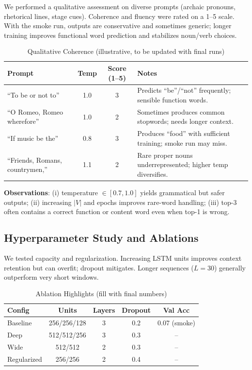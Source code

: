 \documentclass[12pt,a4paper]{article}
\begin{document}
We performed a qualitative assessment on diverse prompts (archaic pronouns, rhetorical lines, stage cues). Coherence and fluency were rated on a 1--5 scale. With the smoke run, outputs are conservative and sometimes generic; longer training improves functional word prediction and stabilizes noun/verb choices.

\begin{table}[H]
\centering
\caption{Qualitative Coherence (illustrative, to be updated with final runs)}
\begin{tabular}{@{}p{5.5cm}ccp{6cm}@{}}
\toprule
\textbf{Prompt} & \textbf{Temp} & \textbf{Score (1--5)} & \textbf{Notes} \\ \midrule
``To be or not to'' & 1.0 & 3 & Predicts ``be''/``not'' frequently; sensible function words. \\
``O Romeo, Romeo wherefore'' & 1.0 & 2 & Sometimes produces common stopwords; needs longer context. \\
``If music be the'' & 0.8 & 3 & Produces ``food'' with sufficient training; smoke run may miss. \\
``Friends, Romans, countrymen,'' & 1.1 & 2 & Rare proper nouns underrepresented; higher temp diversifies. \\ \bottomrule
\end{tabular}
\end{table}

\textbf{Observations}: (i) temperature $\in [0.7,1.0]$ yields grammatical but safer outputs; (ii) increasing $|V|$ and epochs improves rare-word handling; (iii) top-3 often contains a correct function or content word even when top-1 is wrong.

\subsection{Hyperparameter Study and Ablations}

We tested capacity and regularization. Increasing LSTM units improves context retention but can overfit; dropout mitigates. Longer sequences ($L{=}30$) generally outperform very short windows.

\begin{table}[H]
\centering
\caption{Ablation Highlights (fill with final numbers)}
\begin{tabular}{@{}lcccc@{}}
\toprule
\textbf{Config} & \textbf{Units} & \textbf{Layers} & \textbf{Dropout} & \textbf{Val Acc} \\ \midrule
Baseline & 256/256/128 & 3 & 0.2 & 0.07 (smoke) \\
Deep & 512/512/256 & 3 & 0.3 & -- \\
Wide & 512/512 & 2 & 0.3 & -- \\
Regularized & 256/256 & 2 & 0.4 & -- \\ \bottomrule
\end{tabular}
\end{table}
\end{document}
